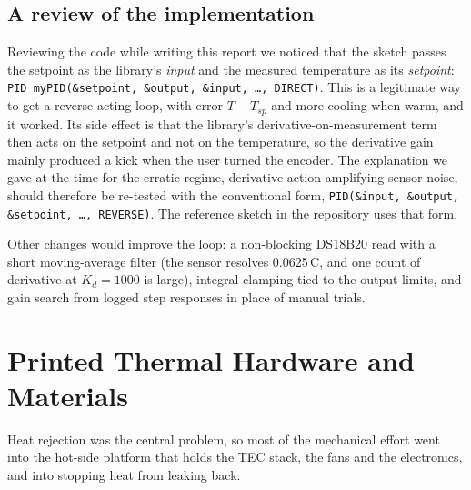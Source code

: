 \documentclass[11pt,letterpaper]{article}
\begin{document}
\subsection{A review of the implementation}\label{sec:review}
Reviewing the code while writing this report we noticed that the sketch passes the setpoint as the library's \emph{input} and the measured temperature as its \emph{setpoint}: \texttt{PID myPID(\&setpoint, \&output, \&input, \ldots, DIRECT)}. This is a legitimate way to get a reverse-acting loop, with error $T-T_{sp}$ and more cooling when warm, and it worked. Its side effect is that the library's derivative-on-measurement term then acts on the setpoint and not on the temperature, so the derivative gain mainly produced a kick when the user turned the encoder. The explanation we gave at the time for the erratic regime, derivative action amplifying sensor noise, should therefore be re-tested with the conventional form, \texttt{PID(\&input, \&output, \&setpoint, \ldots, REVERSE)}. The reference sketch in the repository uses that form.

Other changes would improve the loop: a non-blocking DS18B20 read with a short moving-average filter (the sensor resolves 0.0625\,\textdegree C, and one count of derivative at $K_d=1000$ is large), integral clamping tied to the output limits, and gain search from logged step responses in place of manual trials.

\section{Printed Thermal Hardware and Materials}\label{sec:print}
Heat rejection was the central problem, so most of the mechanical effort went into the hot-side platform that holds the TEC stack, the fans and the electronics, and into stopping heat from leaking back.
\end{document}
